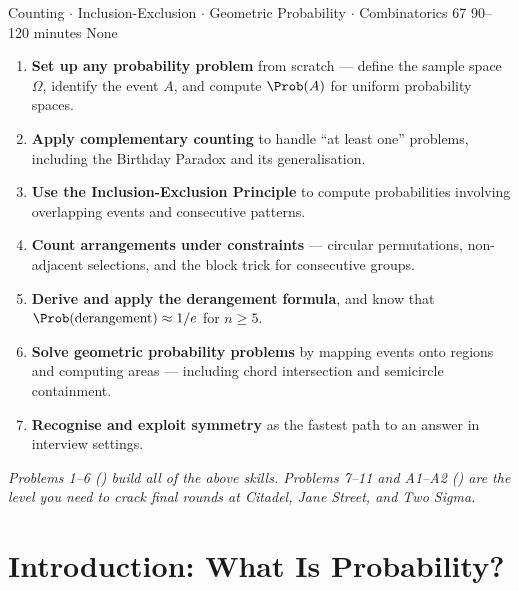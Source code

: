 \documentclass[11pt]{article}
\begin{document}
\epigramtitle
  {Counting $\cdot$ Inclusion-Exclusion $\cdot$ Geometric Probability $\cdot$ Combinatorics}
  {6}{7}
  {90--120 minutes}
  {None}


\begin{tcolorbox}[
  breakable,
  colback=EpiNavy!4,
  colframe=EpiNavy,
  arc=4pt,
  left=12pt, right=12pt, top=10pt, bottom=10pt,
  toptitle=5pt, bottomtitle=5pt,
  colbacktitle=EpiNavy,
  fonttitle=\bfseries\normalsize\color{white},
  title={{\large\strut} By the end of this topic, you will be able to\ldots},
]
\begin{enumerate}[leftmargin=16pt, itemsep=4pt, topsep=2pt]
  \item \textbf{Set up any probability problem} from scratch --- define the
        sample space $\Omega$, identify the event $A$, and compute
        $\Prob(A)$ for uniform probability spaces.
  \item \textbf{Apply complementary counting} to handle ``at least one''
        problems, including the Birthday Paradox and its generalisation.
  \item \textbf{Use the Inclusion-Exclusion Principle} to compute
        probabilities involving overlapping events and consecutive patterns.
  \item \textbf{Count arrangements under constraints} --- circular
        permutations, non-adjacent selections, and the block trick for
        consecutive groups.
  \item \textbf{Derive and apply the derangement formula}, and know that
        $\Prob(\text{derangement}) \approx 1/e$ for $n \geq 5$.
  \item \textbf{Solve geometric probability problems} by mapping events
        onto regions and computing areas --- including chord intersection
        and semicircle containment.
  \item \textbf{Recognise and exploit symmetry} as the fastest path to an
        answer in interview settings.
\end{enumerate}
\vspace{4pt}
{\small\color{EpiDarkGray}\textit{%
  Problems 1--6 (\freelabel) build all of the above skills.
  Problems 7--11 and A1--A2 (\premiumlabel) are the level you need to
  crack final rounds at Citadel, Jane Street, and Two Sigma.}}
\end{tcolorbox}
\vspace{8pt}

\section{Introduction: What Is Probability?}
\end{document}
